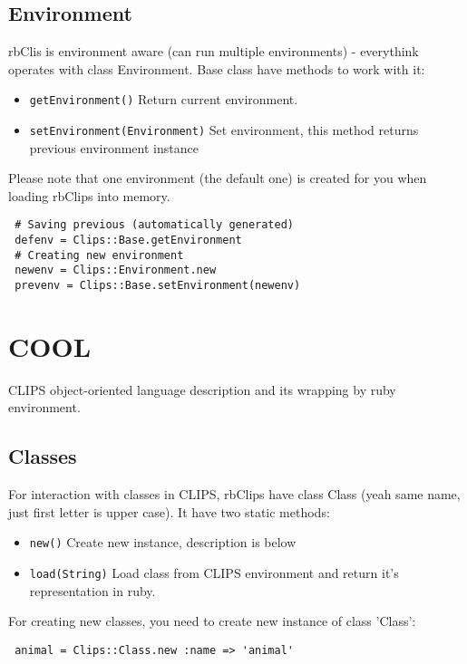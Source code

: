 \documentclass[a4paper,10pt]{article}
\begin{document}
\subsection{Environment}
rbClis is environment aware (can run multiple environments) - everythink operates with class Environment. Base class have methods to work with it:
\begin{itemize}
 \item \texttt{getEnvironment()} Return current environment.
 \item \texttt{setEnvironment(Environment)} Set environment, this method returns previous environment instance
\end{itemize}
Please note that one environment (the default one) is created for you when loading rbClips into memory.

\begin{verbatim}
 # Saving previous (automatically generated)
 defenv = Clips::Base.getEnvironment
 # Creating new environment
 newenv = Clips::Environment.new
 prevenv = Clips::Base.setEnvironment(newenv)
\end{verbatim}

\section{COOL}
CLIPS object-oriented language description and its wrapping by ruby environment.

\subsection{Classes}
For interaction with classes in CLIPS, rbClips have class Class (yeah same name, just first letter is upper case). It have two static methods:
\begin{itemize}
 \item \texttt{new()} Create new instance, description is below
 \item \texttt{load(String)} Load class from CLIPS environment and return it's representation in ruby.
\end{itemize}

For creating new classes, you need to create new instance of class 'Class':
\begin{verbatim}
 animal = Clips::Class.new :name => 'animal'
\end{verbatim}
\end{document}
